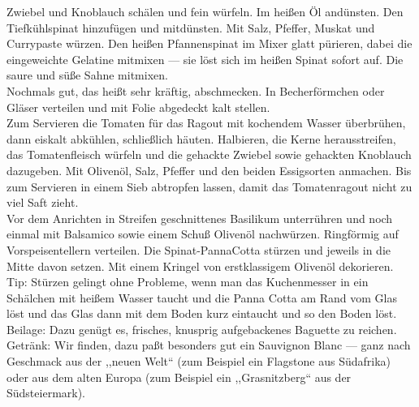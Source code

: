       \begin{zubereitung}
        Zwiebel und Knoblauch schälen und fein würfeln. Im heißen Öl andünsten.
	Den Tiefkühlspinat hinzufügen und mitdünsten. Mit Salz, Pfeffer, Muskat
	und Currypaste würzen. Den heißen Pfannenspinat im Mixer glatt
	pürieren, dabei die eingeweichte Gelatine mitmixen --- sie löst sich im
	heißen Spinat sofort auf. Die saure und süße Sahne mitmixen. \\
        Nochmals gut, das heißt sehr kräftig, abschmecken. In Becherförmchen
	oder Gläser verteilen und mit Folie abgedeckt kalt stellen. \\
        Zum Servieren die Tomaten für das Ragout mit kochendem Wasser
	überbrühen, dann eiskalt abkühlen, schließlich häuten. Halbieren, die
	Kerne herausstreifen, das Tomatenfleisch würfeln und die gehackte
	Zwiebel sowie gehackten Knoblauch dazugeben. Mit Olivenöl, Salz,
	Pfeffer und den beiden Essigsorten anmachen. Bis zum Servieren in einem
	Sieb abtropfen lassen, damit das Tomatenragout nicht zu viel Saft
	zieht. \\
        Vor dem Anrichten in Streifen geschnittenes Basilikum unterrühren und
	noch einmal mit Balsamico sowie einem Schuß Olivenöl nachwürzen.
	Ringförmig auf Vorspeisentellern verteilen. Die Spinat-PannaCotta
	stürzen und jeweils in die Mitte davon setzen. Mit einem Kringel von
	erstklassigem Olivenöl dekorieren. \\
        Tip: Stürzen gelingt ohne Probleme, wenn man das Kuchenmesser in ein
	Schälchen mit heißem Wasser taucht und die Panna Cotta am Rand vom Glas
	löst und das Glas dann mit dem Boden kurz eintaucht und so den Boden
	löst. \\
        Beilage: Dazu genügt es, frisches, knusprig aufgebackenes Baguette zu
	reichen. \\
        Getränk: Wir finden, dazu paßt besonders gut ein Sauvignon Blanc ---
	ganz nach Geschmack aus der ,,neuen Welt`` (zum Beispiel ein Flagstone
	aus Südafrika) oder aus dem alten Europa (zum Beispiel ein
	,,Grasnitzberg`` aus der Südsteiermark). \\
      \end{zubereitung}


